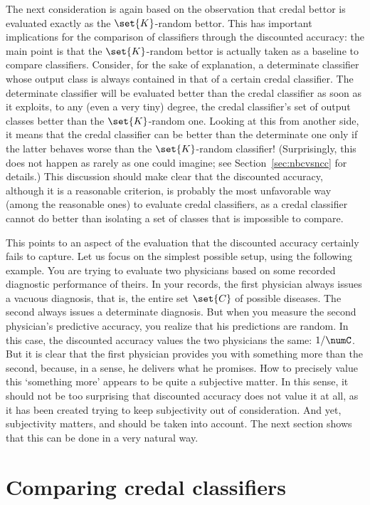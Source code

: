 \documentclass[a4paper,10pt,reqno]{amsart}
\theoremstyle{remark}
\begin{document}
The next consideration is again based on the observation that credal bettor is evaluated exactly as the $\set{K}$-random bettor. This has important implications for the comparison of classifiers through the discounted accuracy: the main point is that the $\set{K}$-random bettor is actually taken as a baseline to compare classifiers. Consider, for the sake of explanation, a determinate classifier whose output class is always contained in that of a certain credal classifier. The determinate classifier will be evaluated better than the credal classifier as soon as it exploits, to any (even a very tiny) degree, the credal classifier's set of output classes better than the $\set{K}$-random one. Looking at this from another side, it means that the credal classifier can be better than the determinate one only if the latter behaves worse than the $\set{K}$-random classifier! (Surprisingly, this does not happen as rarely as one could imagine; see Section~\ref{sec:nbcvsncc} for details.) This discussion should make clear that the discounted accuracy, although it is a reasonable criterion, is probably the most unfavorable way (among the reasonable ones) to evaluate credal classifiers, as a credal classifier cannot do better than isolating a set of classes that is impossible to compare.

This points to an aspect of the evaluation that the discounted accuracy certainly fails to capture. Let us focus on the simplest possible setup, using the following example. You are trying to evaluate two physicians based on some recorded diagnostic performance of theirs. In your records, the first physician always issues a vacuous diagnosis, that is, the entire set $\set{C}$ of possible diseases. The second always issues a determinate diagnosis. But when you measure the second physician's predictive accuracy, you realize that his predictions are random. In this case, the discounted accuracy values the two physicians the same: $1/\numC$. But it is clear that the first physician provides you with something more than the second, because, in a sense, he delivers what he promises. How to precisely value this `something more' appears to be quite a subjective matter. In this sense, it should not be too surprising that discounted accuracy does not value it at all, as it has been created trying to keep subjectivity out of consideration. And yet, subjectivity matters, and should be taken into account. The next section shows that this can be done in a very natural way.

\section{Comparing credal classifiers}\label{sec:compare}
\end{document}
